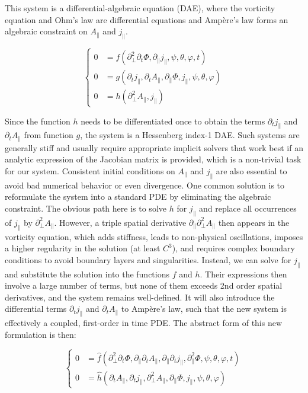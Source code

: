 This system is a differential-algebraic equation (DAE), where the vorticity equation and Ohm's law are differential equations and Ampère's law forms an algebraic constraint on $A_\parallel$ and $j_\parallel$. 

\begin{equation}
	\left\{\begin{aligned}
		0 &= f(\partial^2_\perp \partial_t\Phi,\partial_\parallel j_\parallel,\psi,\theta,\varphi,t)\\
		0 &= g(\partial_t j_\parallel,\partial_t A_\parallel,\partial_\parallel \Phi,j_\parallel,\psi,\theta,\varphi)\\
		0 &= h(\partial^2_\perp A_\parallel,j_\parallel)
	\end{aligned}\right.
\end{equation}

Since the function $h$ needs to be differentiated once to obtain the terms $\partial_t j_\parallel$ and $\partial_t A_\parallel$ from function $g$, the system is a Hessenberg index-1 DAE. Such systems are generally stiff and usually require appropriate implicit solvers that work best if an analytic expression of the Jacobian matrix is provided, which is a non-trivial task for our system. Consistent initial conditions on $A_\parallel$ and $j_\parallel$ are also essential to avoid bad numerical behavior or even divergence. One common solution is to reformulate the system into a standard PDE by eliminating the algebraic constraint. The obvious path here is to solve $h$ for $j_\parallel$ and replace all occurrences of $j_\parallel$ by $\partial_\perp^2 A_\parallel$. However, a triple spatial derivative $\partial_\parallel\partial_\perp^2 A_\parallel$ then appears in the vorticity equation, which adds stiffness, leads to non-physical oscillations, imposes a higher regularity in the solution (at least $C^3$), and requires complex boundary conditions to avoid boundary layers and singularities. Instead, we can solve for $j_\parallel$ and substitute the solution into the functions $f$ and $h$. Their expressions then involve a large number of terms, but none of them exceeds 2nd order spatial derivatives, and the system remains well-defined. It will also introduce the differential terms $\partial_t j_\parallel$ and $\partial_t A_\parallel$ to Ampère's law, such that the new system is effectively a coupled, first-order in time PDE. The abstract form of this new formulation is then:

\begin{equation}
	\left\{\begin{aligned}
		0 &= \hat{f}(\partial^2_\perp \partial_t\Phi,\partial_\parallel \partial_t A_\parallel,\partial_\parallel \partial_t j_\parallel,\partial_\parallel^2 \Phi,\psi,\theta,\varphi,t)\\
		0 &= \hat{h}(\partial_t A_\parallel,\partial_t j_\parallel,\partial^2_\perp A_\parallel,\partial_\parallel \Phi,j_\parallel,\psi,\theta,\varphi)
	\end{aligned}\right.
\end{equation}

